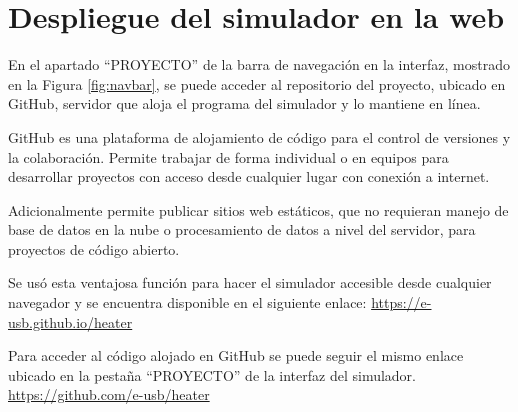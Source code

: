 \section{Despliegue del simulador en la web}
\par En el apartado ``PROYECTO'' de la barra de navegación en la interfaz, mostrado en la Figura \ref{fig:navbar}, se puede acceder al repositorio del proyecto, ubicado en GitHub, servidor que aloja el programa del simulador y lo mantiene en línea.
\par GitHub es una plataforma de alojamiento de código para el control de versiones y la colaboración. Permite trabajar de forma individual o en equipos para desarrollar proyectos con acceso desde cualquier lugar con conexión a internet.
\par Adicionalmente permite publicar sitios web estáticos, que no requieran manejo de base de datos en la nube o procesamiento de datos a nivel del servidor, para proyectos de código abierto.
\par Se usó esta ventajosa función para hacer el simulador accesible desde cualquier navegador y se encuentra disponible en el siguiente enlace: \url{https://e-usb.github.io/heater}
\par Para acceder al código alojado en GitHub se puede seguir el mismo enlace ubicado en la pestaña ``PROYECTO'' de la interfaz del simulador. \url{https://github.com/e-usb/heater}